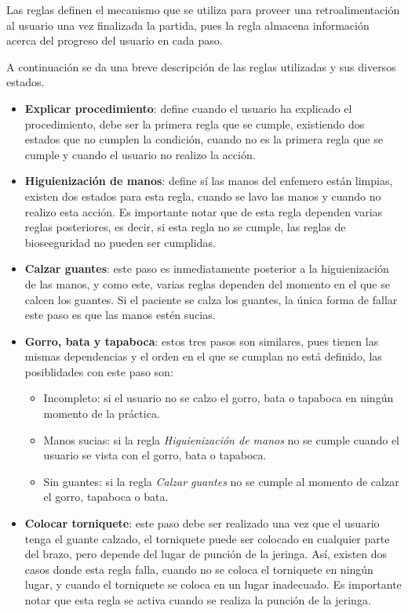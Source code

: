 Las reglas definen el mecanismo que se utiliza para proveer una retroalimentación
al usuario una vez finalizada la partida, pues la regla almacena información 
acerca del progreso del usuario en cada paso.

A continuación se da una breve descripción de las reglas utilizadas y sus
diversos estados.

\begin{itemize}
\item \textbf{Explicar procedimiento}: define cuando el usuario ha explicado el
    procedimiento, debe ser la primera regla que se cumple, existiendo dos
    estados que no cumplen la condición, cuando no es la primera regla que se
    cumple y cuando el usuario no realizo la acción.

\item \textbf{Higuienización de manos}: define sí las manos del enfemero están
    limpias, existen dos estados para esta regla, cuando se lavo las manos y
    cuando no realizo esta acción. Es importante notar que de esta regla
    dependen varias reglas posteriores, es decir, si esta regla no se cumple,
    las reglas de bioseeguridad no pueden ser cumplidas.

\item \textbf{Calzar guantes}: este paso es inmediatamente posterior a la
    higuienización de las manos, y como este, varias reglas dependen del momento
    en el que se calcen los guantes. Si el paciente se calza los guantes, la
    única forma de fallar este paso es que las manos estén sucias.

\item \textbf{Gorro, bata y tapaboca}: estos tres pasos son similares, pues
    tienen las mismas dependencias y el orden en el que se cumplan no está
    definido, las posiblidades con este paso son:
    \begin{itemize}
    \item Incompleto: si el usuario no se calzo el gorro, bata o tapaboca en
        ningún momento de la práctica.
    \item Manos sucias: si la regla \emph{Higuienización de manos} no se cumple
        cuando el usuario se vista con el gorro, bata o tapaboca.
    \item Sin guantes: si la regla \emph{Calzar guantes} no se cumple al momento
        de calzar el gorro, tapaboca o bata. 
    \end{itemize}
    
\item \textbf{Colocar torniquete}: este paso debe ser realizado una vez que el
    usuario tenga el guante calzado, el torniquete puede ser colocado en
    cualquier parte del brazo, pero depende del lugar de punción de la jeringa.
    Así, existen dos casos donde esta regla falla, cuando no se coloca el
    torniquete en ningún lugar, y cuando el torniquete se coloca en un lugar
    inadecuado. Es importante notar que esta regla se activa cuando se realiza
    la punción de la jeringa.


\end{itemize}
